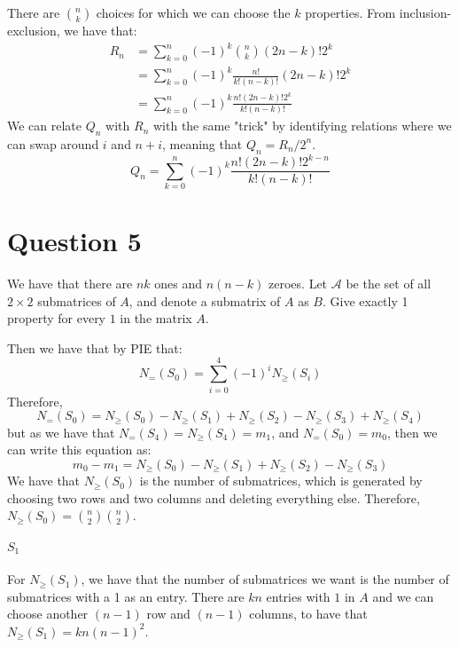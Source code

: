 \documentclass[]{article}
\begin{document}
There are $\binom{n}{k}$ choices for which we can choose the $k$ properties. From inclusion-exclusion, we have that:
\begin{align*}
	R_n &=  \sum_{k = 0}^n (-1)^k \binom{n}{k} (2n - k)!2^k\\ 
	&=  \sum_{k = 0}^n (-1)^k \frac{n!}{k! (n - k)!} (2n - k)!2^k\\
	&= \sum_{k = 0}^n (-1)^k \frac{n!(2n - k)! 2^k}{k! (n - k)!}
\end{align*}
We can relate $Q_n$ with $R_n$ with the same "trick" by identifying relations where we can swap around $i$ and $n+ i$, meaning that $Q_n = R_n/2^n$. 
\begin{equation}
	Q_n = \sum_{k = 0}^n (-1)^k \frac{n!(2n - k)! 2^{k - n}}{k! (n - k)!}
\end{equation}
\newpage
\section{Question 5}
We have that there are $nk$ ones and $n(n-k)$ zeroes. 
Let $\mathcal{A}$ be the set of all $2 \times 2$ submatrices of $A$, and denote a submatrix of $A$ as $B$. Give exactly 1 property for every $1$ in the matrix $A$. 

Then we have that by PIE that:
\begin{equation}
	N_{=}(S_0) = \sum_{i= 0}^4 (-1)^{i} N_{\geq}(S_i) 
\end{equation}
Therefore, 
\begin{equation}
	N_{=}(S_0) = N_{\geq}(S_0) - N_{\geq}(S_1) + N_{\geq}(S_2) - N_{\geq}(S_3) + N_{\geq}(S_4)    
\end{equation}
but as we have that $N_{=}(S_4) = N_{\geq}(S_4) = m_1$, and $N_{=}(S_0) = m_0$, then we can write this equation as:
\begin{equation}
	m_0 - m_1 = N_{\geq}(S_0) - N_{\geq}(S_1) + N_{\geq}(S_2) - N_{\geq}(S_3)    
\end{equation}
We have that $N_{\geq}(S_0)$ is the number of submatrices, which is generated by choosing two rows and two columns and deleting everything else. Therefore, $N_{\geq}(S_0) = \binom{n}{2}\binom{n}{2}$.
\paragraph{$S_1$}
For $N_{\geq}(S_1)$, we have that the number of submatrices we want is the number of submatrices with a 1 as an entry. There are $kn$ entries with $1$ in $A$ and we can choose another $(n-1)$ row and $(n-1)$ columns, to have that $N_{\geq}(S_1) = kn(n-1)^2$.
\end{document}
